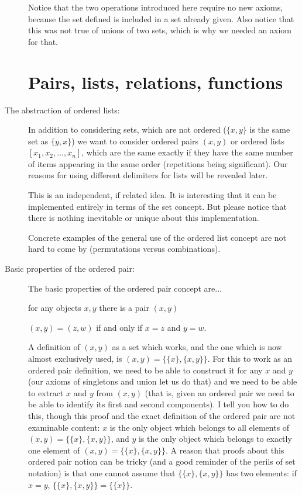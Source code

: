 \documentclass[12pt]{article}
\begin{document}
\begin{description}
Notice that the two operations introduced here require no new axioms, because the set defined is included in a set already given.  Also notice that this was not true of unions of two sets, which is why we needed an axiom for that.

\newpage



\section{Pairs, lists, relations, functions}


\item[The abstraction of ordered lists:]

In addition to considering sets, which are not ordered ($\{x,y\}$ is the same set as $\{y,x\}$) we want to consider
ordered pairs $(x,y)$ or ordered lists $[x_1,x_2,\ldots,x_n]$, which are the same exactly if they have the same number of items appearing in the same order (repetitions being significant).  Our reasons for using different delimiters for lists will be revealed later.

This is an independent, if related idea.  It is interesting that it can be implemented entirely in terms of the set concept.  But please notice that there is nothing inevitable or unique about this implementation.

Concrete examples of the general use of the ordered list concept are not hard to come by (permutations versus combinations).

\item[Basic properties of the ordered pair:]

The basic properties of the ordered pair concept are...

for any objects $x,y$ there is a pair $(x,y)$

$(x,y) = (z,w)$ if and only if $x=z$ and $y=w$.

A definition of $(x,y)$ as a set which works, and the one which is now almost exclusively used, is $(x,y) = \{\{x\},\{x,y\}\}$.  For this to work as an ordered pair definition, we
need to be able to construct it for any $x$ and $y$ (our axioms of singletons and union let us do that) and we need to be able to extract $x$ and $y$ from $(x,y)$ (that is, given an ordered pair we need to be able to identify its first and second components).  I tell you how to do this, though this proof and the exact definition of the ordered pair are not examinable content:  $x$ is the only object which belongs to all  elements of $(x,y) = \{\{x\},\{x,y\}\}$, and
$y$ is the only object which belongs to exactly one element of $(x,y) = \{\{x\},\{x,y\}\}$.  A reason that proofs about this ordered pair notion can be tricky (and a good reminder of the perils of set notation) is that one cannot assume that $\{\{x\},\{x,y\}\}$ has two elements:  if $x=y$, $\{\{x\},\{x,y\}\}= \{\{x\}\}$.


\end{description}
\end{document}
